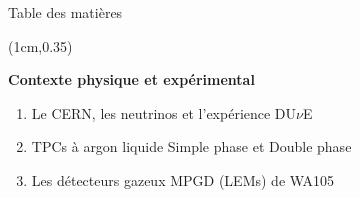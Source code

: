 

\tracksfalse



    {
        \begin{specialframe}
            \vspace{2cm}\hspace*{-1.8cm}\parbox[t]{\textwidth}{\titlepage}
        \end{specialframe}
    }
    \begin{specialframe}{Table des matières}
        \begin{textblock*}{\textwidth}(1cm,0.35\textheight)
            \tableofcontents[hideallsubsections]
        \end{textblock*}
    \end{specialframe}

  \setcounter{framenumber}{0}
    {
        \begin{specialframe}
            \vspace{2cm}\hspace*{-1.8cm}\parbox[t]{\textwidth}{
                \begin{center}
                    \begin{huge}
                            \textcolor{pheniics_purple}{\textbf{Contexte physique et expérimental}}
                    \end{huge}
                    \vspace{1cm}
                    \begin{enumerate}
                        \item Le CERN, les neutrinos et l'expérience DU$\nu$E 
                        \item TPCs à argon liquide Simple phase et Double phase
                        \item Les détecteurs gazeux MPGD (LEMs) de WA105
                    \end{enumerate}
                \end{center}
            }
        \end{specialframe}
    }

